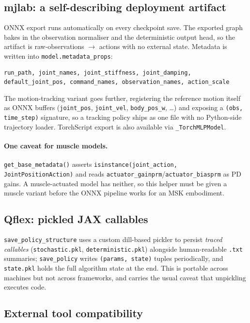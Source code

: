 \documentclass[11pt,a4paper]{article}
\begin{document}
\subsection{mjlab: a self-describing deployment artifact}

ONNX export runs automatically on every checkpoint save. The exported graph bakes in the
observation normaliser and the deterministic output head, so the artifact is
raw-observations $\rightarrow$ actions with no external state. Metadata is written into
\texttt{model.metadata\_props}:

\begin{lstlisting}
run_path, joint_names, joint_stiffness, joint_damping,
default_joint_pos, command_names, observation_names, action_scale
\end{lstlisting}

\noindent
The motion-tracking variant goes further, registering the reference motion itself as ONNX
buffers (\texttt{joint\_pos}, \texttt{joint\_vel}, \texttt{body\_pos\_w}, \ldots) and
exposing a \texttt{(obs, time\_step)} signature, so a tracking policy ships as one file
with no Python-side trajectory loader. TorchScript export is also available via
\texttt{\_TorchMLPModel}.

\paragraph{One caveat for muscle models.} \texttt{get\_base\_metadata()} asserts
\texttt{isinstance(joint\_action, JointPositionAction)} and reads
\texttt{actuator\_gainprm}/\texttt{actuator\_biasprm} as PD gains. A muscle-actuated model
has neither, so this helper must be given a muscle variant before the ONNX pipeline works
for an MSK embodiment.

\subsection{Qflex: pickled JAX callables}

\texttt{save\_policy\_structure} uses a custom dill-based pickler to persist \emph{traced
callables} (\texttt{stochastic.pkl}, \texttt{deterministic.pkl}) alongside human-readable
\texttt{.txt} summaries; \texttt{save\_policy} writes \texttt{(params, state)} tuples
periodically, and \texttt{state.pkl} holds the full algorithm state at the end. This is
portable across machines but not across frameworks, and carries the usual caveat that
unpickling executes code.

\subsection{External tool compatibility}
\end{document}

